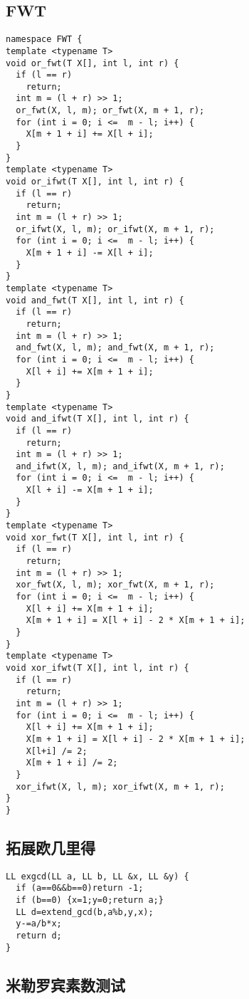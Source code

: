 \subsection{FWT}
\begin{lstlisting}
namespace FWT {
template <typename T>
void or_fwt(T X[], int l, int r) {
  if (l == r)
    return;
  int m = (l + r) >> 1;
  or_fwt(X, l, m); or_fwt(X, m + 1, r);
  for (int i = 0; i <=  m - l; i++) {
    X[m + 1 + i] += X[l + i];
  }
}
template <typename T>
void or_ifwt(T X[], int l, int r) {
  if (l == r)
    return;
  int m = (l + r) >> 1;
  or_ifwt(X, l, m); or_ifwt(X, m + 1, r);
  for (int i = 0; i <=  m - l; i++) {
    X[m + 1 + i] -= X[l + i];
  }
}
template <typename T>
void and_fwt(T X[], int l, int r) {
  if (l == r)
    return;
  int m = (l + r) >> 1;
  and_fwt(X, l, m); and_fwt(X, m + 1, r);
  for (int i = 0; i <=  m - l; i++) {
    X[l + i] += X[m + 1 + i];
  }
}
template <typename T>
void and_ifwt(T X[], int l, int r) {
  if (l == r)
    return;
  int m = (l + r) >> 1;
  and_ifwt(X, l, m); and_ifwt(X, m + 1, r);
  for (int i = 0; i <=  m - l; i++) {
    X[l + i] -= X[m + 1 + i];
  }
}
template <typename T>
void xor_fwt(T X[], int l, int r) {
  if (l == r)
    return;
  int m = (l + r) >> 1;
  xor_fwt(X, l, m); xor_fwt(X, m + 1, r);
  for (int i = 0; i <=  m - l; i++) {
    X[l + i] += X[m + 1 + i];
    X[m + 1 + i] = X[l + i] - 2 * X[m + 1 + i];
  }
}
template <typename T>
void xor_ifwt(T X[], int l, int r) {
  if (l == r)
    return;
  int m = (l + r) >> 1;
  for (int i = 0; i <=  m - l; i++) {
    X[l + i] += X[m + 1 + i];
    X[m + 1 + i] = X[l + i] - 2 * X[m + 1 + i];
    X[l+i] /= 2;
    X[m + 1 + i] /= 2;
  }
  xor_ifwt(X, l, m); xor_ifwt(X, m + 1, r);
}
}
\end{lstlisting}

\subsection{拓展欧几里得}
\begin{lstlisting}
LL exgcd(LL a, LL b, LL &x, LL &y) {
  if (a==0&&b==0)return -1;
  if (b==0) {x=1;y=0;return a;}
  LL d=extend_gcd(b,a%b,y,x);
  y-=a/b*x;
  return d;
}
\end{lstlisting}


\subsection{米勒罗宾素数测试}

